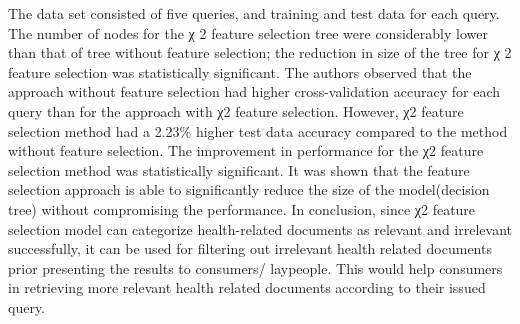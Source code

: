 \documentclass[]{article}
\begin{document}
The data set consisted of five queries, and training and test data for each query. The number of nodes for the χ 2 feature selection tree were considerably lower than that of tree without feature selection; the reduction in size of the tree for χ 2 feature selection was statistically significant. The authors observed that the approach without feature selection had higher cross-validation accuracy for each query than for the approach with χ2 feature selection. However, χ2 feature selection method had a 2.23\% higher test data accuracy compared to the method without feature selection. The improvement in performance for the χ2 feature selection method was statistically significant. It was shown that the feature selection approach is able to significantly reduce the size of the model(decision tree) without compromising the performance. In conclusion, since χ2 feature selection model can categorize health-related documents as relevant and irrelevant successfully, it can be used for filtering out irrelevant health related documents prior presenting the results to consumers/ laypeople. This would help consumers in retrieving more relevant health related documents according to their issued query.
\end{document}

